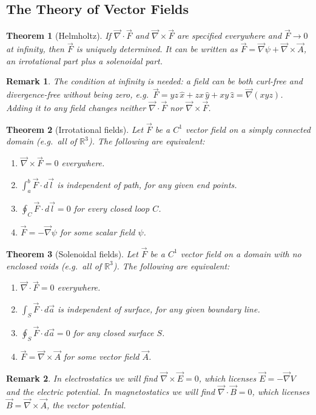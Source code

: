 \documentclass{article}
\newtheorem{theorem}{Theorem}
\newtheorem{remark}{Remark}
\begin{document}
\subsection{The Theory of Vector Fields}
\begin{theorem}[Helmholtz]
    If $\vec{\nabla}\cdot\vec{F}$ and $\vec{\nabla}\times\vec{F}$ are specified everywhere and $\vec{F}\to 0$ at infinity, then $\vec{F}$ is uniquely determined. It can be written as $\vec{F} = \vec{\nabla}\psi + \vec{\nabla}\times\vec{A}$, an irrotational part plus a solenoidal part.
\end{theorem}
\begin{remark}
    The condition at infinity is needed: a field can be both curl-free and divergence-free without being zero, e.g.\ $\vec{F} = yz\,\hat{x} + zx\,\hat{y} + xy\,\hat{z} = \vec{\nabla}(xyz)$. Adding it to any field changes neither $\vec{\nabla}\cdot\vec{F}$ nor $\vec{\nabla}\times\vec{F}$.
\end{remark}
\begin{theorem}[Irrotational fields]
    Let $\vec{F}$ be a $C^1$ vector field on a simply connected domain (e.g.\ all of $\mathbb{R}^3$). The following are equivalent:
    \begin{enumerate}[label=(\roman*)]
        \item $\vec{\nabla}\times\vec{F} = 0$ everywhere.
        \item $\int_a^b \vec{F}\cdot d\vec{l}$ is independent of path, for any given end points.
        \item $\oint_C \vec{F}\cdot d\vec{l} = 0$ for every closed loop $C$.
        \item $\vec{F} = -\vec{\nabla}\psi$ for some scalar field $\psi$.
    \end{enumerate}
\end{theorem}
\begin{theorem}[Solenoidal fields]
    Let $\vec{F}$ be a $C^1$ vector field on a domain with no enclosed voids (e.g.\ all of $\mathbb{R}^3$). The following are equivalent:
    \begin{enumerate}[label=(\roman*)]
        \item $\vec{\nabla}\cdot\vec{F} = 0$ everywhere.
        \item $\int_S \vec{F}\cdot d\vec{a}$  is independent of surface, for any given boundary line.
        \item $\oint_S \vec{F}\cdot d\vec{a} = 0$ for any closed surface $S$.
        \item $\vec{F} = \vec{\nabla}\times\vec{A}$ for some vector field $\vec{A}$.
    \end{enumerate}
\end{theorem}
\begin{remark}
    In electrostatics we will find $\vec{\nabla}\times\vec{E} = 0$, which licenses $\vec{E} = -\vec{\nabla}V$ and the electric potential. In magnetostatics we will find $\vec{\nabla}\cdot\vec{B} = 0$, which licenses $\vec{B} = \vec{\nabla}\times\vec{A}$, the vector potential.
\end{remark}
\end{document}

